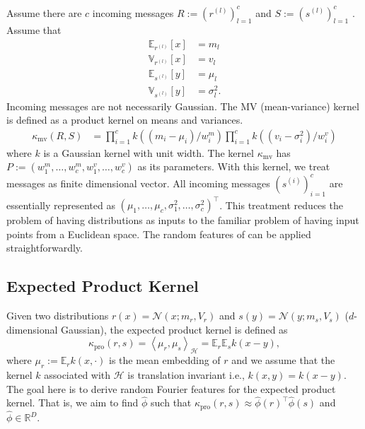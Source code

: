 \documentclass[english]{article}
\theoremstyle{plain}
\theoremstyle{plain}
\begin{document}
Assume there are $c$ incoming messages $R:=\left(r^{(l)}\right)_{l=1}^{c}$ 
and $S:=\left(s^{(l)}\right)_{l=1}^{c}$
. Assume that
\begin{align*}
\mathbb{E}_{r^{(l)}}\left[x\right] & =m_{l}\\
\mathbb{V}_{r^{(l)}}\left[x\right] & =v_{l}\\
\mathbb{E}_{s^{(l)}}\left[y\right] & =\mu_{l}\\
\mathbb{V}_{s^{(l)}}\left[y\right] & =\sigma_{l}^{2}.
\end{align*}
%
Incoming messages are not necessarily Gaussian. 
The MV (mean-variance) kernel is defined as a product
kernel on means and variances. 
\begin{align*}
\kappa_{\text{mv}}\left(R, S\right) 
 &=\prod_{i=1}^{c}k\left(\left(m_{i}-\mu_{i}\right)/w_{i}^{m}\right)\prod_{i=1}^{c}k\left(\left(v_{i}-\sigma_{i}^{2}\right)/w_{i}^{v}\right)
\end{align*}
where $k$ is a Gaussian kernel with unit width. The kernel $\kappa_{\text{mv}}$
has $P:=\left(w_{1}^{m},\ldots,w_{c}^{m},w_{1}^{v},\ldots,w_{c}^{v}\right)$
as its parameters. With this kernel, we treat messages as finite dimensional
vector. All incoming messages $(s^{(i)})_{i=1}^{c}$ are essentially
represented as $\left(\mu_{1},\ldots,\mu_{c},\sigma_{1}^{2},\ldots,\sigma_{c}^{2}\right)^{\top}$.
This treatment reduces the problem of having distributions as inputs
to the familiar problem of having input points from a Euclidean space.
The random features of \cite{Rahimi2007} can be applied straightforwardly. 

\subsection{Expected Product Kernel\label{sub:Expected-Product-Kernel}}
Given two distributions $r(x)=\mathcal{N}(x;m_{r},V_{r})$ and $s(y)=\mathcal{N}(y;m_{s},V_{s})$
($d$-dimensional Gaussian), the expected product kernel is defined
as 
\[
\kappa_{\text{pro}}(r, s)=\left\langle \mu_{r},\mu_{s}\right\rangle _{\mathcal{H}}=\mathbb{E}_{r}\mathbb{E}_{s}k(x-y),
\]
where $\mu_{r}:=\mathbb{E}_{r}k(x,\cdot)$ is the mean embedding of
$r$ and we assume that the kernel $k$ associated with $\mathcal{H}$
is translation invariant i.e., $k(x,y)=k(x-y)$. The goal here is
to derive random Fourier features for the expected product kernel.
That is, we aim to find $\hat{\phi}$ such that $\kappa_{\text{pro}}(r, s)\approx\hat{\phi}(r)^{\top}\hat{\phi}(s)$
and $\hat{\phi}\in\mathbb{R}^{D}$. 
\end{document}
